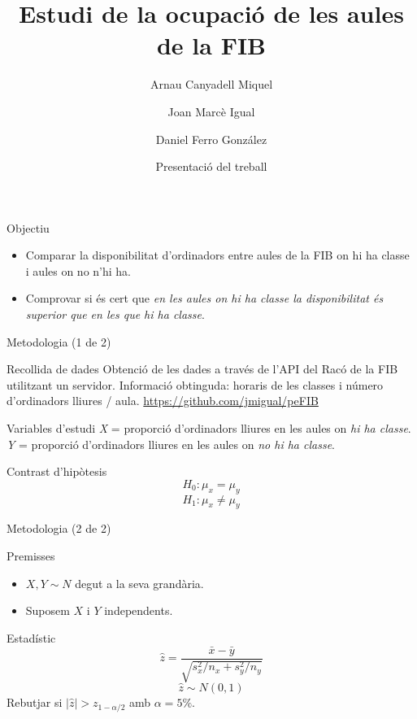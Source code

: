 \documentclass[xetex,mathserif,serif]{beamer}
\title{Estudi de la ocupació de les aules de la FIB}
\author{Arnau Canyadell Miquel \and Joan Marcè Igual \and Daniel Ferro González}
\date[Juny 2015] %
{Presentació del treball}
\begin{document}
  
  \frame{\titlepage}
  
  \begin{frame}{Objectiu}
    \begin{itemize}
      \item Comparar la disponibilitat d'ordinadors entre aules de la FIB on hi ha classe i aules on no n'hi ha.
      \item Comprovar si és cert que \emph{en les aules on hi ha classe la disponibilitat és superior que en les que hi ha classe}.
    \end{itemize}
  \end{frame}
  
  \begin{frame}{Metodologia (1 de 2)}
    \begin{block}{Recollida de dades}
      Obtenció de les dades a través de l'API del Racó de la FIB utilitzant un servidor.
      Informació obtinguda: horaris de les classes i número d'ordinadors lliures / aula.
      \url{https://github.com/jmigual/peFIB}
    \end{block}
    
    \begin{block}{Variables d'estudi}
      \emph{X} = proporció d'ordinadors lliures en les aules on \emph{hi ha classe}.
      \emph{Y} = proporció d'ordinadors lliures en les aules on \emph{no hi ha classe}.
    \end{block}
    
    \begin{block}{Contrast d'hipòtesis}
      $$H_0: \mu_x = \mu_y$$
      $$H_1: \mu_x \neq \mu_y$$
    \end{block}
  \end{frame}

  \begin{frame}{Metodologia (2 de 2)}
    \begin{block}{Premisses}
      \begin{itemize}
        \item $X,Y \sim N$ degut a la seva grandària.
        \item Suposem $X$ i $Y$ independents.
      \end{itemize}
    \end{block}
    
    \begin{block}{Estadístic}
      $$\hat{z} = \frac{\bar{x} - \bar{y}}{\sqrt{s_x^2/n_x + s_y^2/n_y}} $$
      $$\hat{z} \sim N(0,1)$$
      \centering
      Rebutjar si $|\hat{z}| > z_{1 - \alpha/2}$ amb $\alpha = 5\%$.
    \end{block}
  \end{frame}
  
\end{document}
